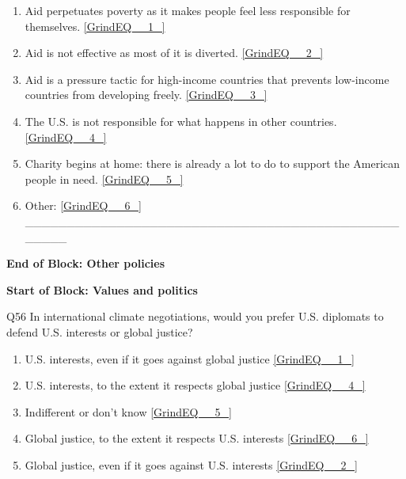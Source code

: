 \documentclass{article} %
\begin{document}
\begin{enumerate}
\item  Aid perpetuates poverty as it makes people feel less responsible for themselves.  \eqref{GrindEQ__1_} 

\item  Aid is not effective as most of it is diverted.  \eqref{GrindEQ__2_} 

\item  Aid is a pressure tactic for high-income countries that prevents low-income countries from developing freely.  \eqref{GrindEQ__3_} 

\item  The U.S. is not responsible for what happens in other countries.  \eqref{GrindEQ__4_} 

\item  Charity begins at home: there is already a lot to do to support the American people in need.  \eqref{GrindEQ__5_} 

\item  Other:  \eqref{GrindEQ__6_} \_\_\_\_\_\_\_\_\_\_\_\_\_\_\_\_\_\_\_\_\_\_\_\_\_\_\_\_\_\_\_\_\_\_\_\_\_\_\_\_\_\_\_\_\_\_\_\_\_\_
\end{enumerate}

\noindent 

\noindent \textbf{End of Block: Other policies}

\noindent \textbf{}

\noindent \textbf{Start of Block: Values and politics}

\noindent 

\noindent Q56 In international climate negotiations, would you prefer U.S. diplomats to defend U.S. interests or global justice?

\begin{enumerate}
\item  U.S. interests, even if it goes against global justice  \eqref{GrindEQ__1_} 

\item  U.S. interests, to the extent it respects global justice  \eqref{GrindEQ__4_} 

\item  Indifferent or don't know  \eqref{GrindEQ__5_} 

\item  Global justice, to the extent it respects U.S. interests  \eqref{GrindEQ__6_} 

\item  Global justice, even if it goes against U.S. interests  \eqref{GrindEQ__2_} 
\end{enumerate}
\end{document}
